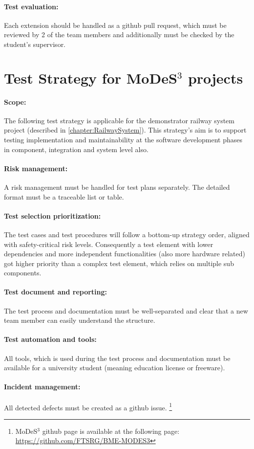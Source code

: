 \paragraph{Test evaluation:} Each extension should be handled as a github pull request, which must be reviewed by 2 of the team members and additionally must be checked by the student's supervisor.

\section{Test Strategy for MoDeS$^3$ projects}
\paragraph{Scope:} The following test strategy is applicable for the demonstrator railway system project (described in \autoref{chapter:RailwaySystem}). This strategy's aim is to support testing implementation and maintainability at the software development phases in component, integration and system level also.
\paragraph{Risk management:} A risk management must be handled for test plans separately. The detailed format must be a traceable list or table.
\paragraph{Test selection prioritization:} The test cases and test procedures will follow a bottom-up strategy order, aligned with safety-critical risk levels. Consequently a test element with lower dependencies and more independent functionalities (also more hardware related) got higher priority than a complex test element, which relies on multiple sub components.
\paragraph{Test document and reporting:} The test process and documentation must be well-separated and clear that a new team member can easily understand the structure.
\paragraph{Test automation and tools:} All tools, which is used during the test process and documentation must be available for a university student (meaning education license or freeware).
\paragraph{Incident management:} All detected defects must be created as a github issue. \footnote{MoDeS$^3$ github page is available at the following page: \url{https://github.com/FTSRG/BME-MODES3}}
